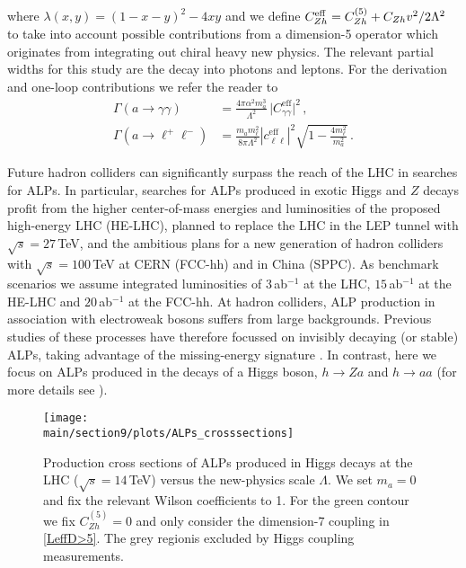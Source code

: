 %
where $\lambda(x,y)=(1-x-y)^2-4xy$ and we define $C_{Zh}^{\rm eff} = C_{Zh}^{(5)} + C_{Zh} v^2/2 \Lambda^2$ to take into account possible contributions from a dimension-5 operator which originates from integrating out chiral heavy new physics. The relevant partial widths for this study are the decay into photons and leptons. For the derivation and one-loop contributions we refer the reader to \cite{Bauer:2017ris}
%
\begin{align}
 \Gamma(a\to\gamma\gamma)  &= \frac{4\pi\alpha^2 m_a^3}{\Lambda^2}\,\big| C_{\gamma\gamma}^\text{eff} \big|^2 \,, \\
 \Gamma(a\to \ell^+ \ell^-)&=\frac{m_a m_\ell^2}{8\pi\Lambda^2} \left| c_{\ell\ell}^\text{eff}\right|^2 \sqrt{1-\frac{4m_\ell^2}{m_a^2}}\,.
\end{align}
%


Future hadron colliders can significantly surpass the reach of the LHC in searches for ALPs. In particular, searches for ALPs produced in exotic Higgs and $Z$ decays profit from the higher center-of-mass energies and luminosities of the proposed high-energy LHC (HE-LHC), planned to replace the LHC in the LEP tunnel with $\sqrt{s}=27 \,$TeV, and the ambitious plans for a new generation of hadron colliders with $\sqrt{s}=100\,$TeV at CERN (FCC-hh) and in China (SPPC). As benchmark scenarios we assume integrated luminosities of $3$\,ab$^{-1}$ at the LHC, $15$\,ab$^{-1}$ at the HE-LHC and $20$\,ab$^{-1}$ at the FCC-hh.
At hadron colliders, ALP production in association with electroweak bosons suffers from large backgrounds. Previous studies of these processes have therefore focussed on invisibly decaying (or stable) ALPs, taking advantage of the missing-energy signature \cite{Mimasu:2014nea,Brivio:2017ije}. In contrast, here we focus on ALPs produced in the decays of a Higgs boson, $h\to Za$ and $h \to a a$ (for more details see \cite{Bauer:2018uxu}).


%
\begin{figure}
\begin{center}
    \texttt{[image: \\main/section9/plots/ALPs\_crosssections]}
\caption{\label{fig:ALPpsec} Production cross sections of ALPs produced in Higgs decays at the LHC ($\sqrt{s} = 14\,$TeV) versus the new-physics scale $\Lambda$. We set $m_a=0$ and fix the relevant Wilson coefficients to 1. For the green contour we fix $C_{Zh}^{(5)}=0$ and only consider the dimension-7 coupling in \eqref{LeffD>5}.
The grey regionis excluded by Higgs coupling measurements. }
\end{center}
\end{figure}
%

